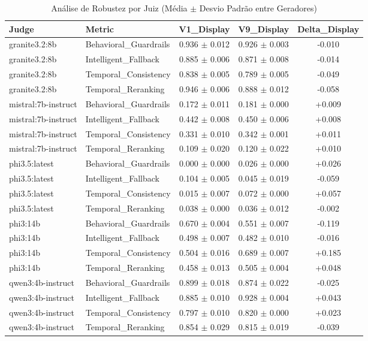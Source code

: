 \begin{table}
\caption{Análise de Robustez por Juiz (Média $\pm$ Desvio Padrão entre Geradores)}
\label{tab:robustez_por_juiz}
\begin{tabular}{llccc}
\toprule
Judge & Metric & V1_Display & V9_Display & Delta_Display \\
\midrule
granite3.2:8b & Behavioral_Guardrails & 0.936 $\pm$ 0.012 & 0.926 $\pm$ 0.003 & -0.010 \\
granite3.2:8b & Intelligent_Fallback & 0.885 $\pm$ 0.006 & 0.871 $\pm$ 0.008 & -0.014 \\
granite3.2:8b & Temporal_Consistency & 0.838 $\pm$ 0.005 & 0.789 $\pm$ 0.005 & -0.049 \\
granite3.2:8b & Temporal_Reranking & 0.946 $\pm$ 0.006 & 0.888 $\pm$ 0.012 & -0.058 \\
mistral:7b-instruct & Behavioral_Guardrails & 0.172 $\pm$ 0.011 & 0.181 $\pm$ 0.000 & +0.009 \\
mistral:7b-instruct & Intelligent_Fallback & 0.442 $\pm$ 0.008 & 0.450 $\pm$ 0.006 & +0.008 \\
mistral:7b-instruct & Temporal_Consistency & 0.331 $\pm$ 0.010 & 0.342 $\pm$ 0.001 & +0.011 \\
mistral:7b-instruct & Temporal_Reranking & 0.109 $\pm$ 0.020 & 0.120 $\pm$ 0.022 & +0.010 \\
phi3.5:latest & Behavioral_Guardrails & 0.000 $\pm$ 0.000 & 0.026 $\pm$ 0.000 & +0.026 \\
phi3.5:latest & Intelligent_Fallback & 0.104 $\pm$ 0.005 & 0.045 $\pm$ 0.019 & -0.059 \\
phi3.5:latest & Temporal_Consistency & 0.015 $\pm$ 0.007 & 0.072 $\pm$ 0.000 & +0.057 \\
phi3.5:latest & Temporal_Reranking & 0.038 $\pm$ 0.000 & 0.036 $\pm$ 0.012 & -0.002 \\
phi3:14b & Behavioral_Guardrails & 0.670 $\pm$ 0.004 & 0.551 $\pm$ 0.007 & -0.119 \\
phi3:14b & Intelligent_Fallback & 0.498 $\pm$ 0.007 & 0.482 $\pm$ 0.010 & -0.016 \\
phi3:14b & Temporal_Consistency & 0.504 $\pm$ 0.016 & 0.689 $\pm$ 0.007 & +0.185 \\
phi3:14b & Temporal_Reranking & 0.458 $\pm$ 0.013 & 0.505 $\pm$ 0.004 & +0.048 \\
qwen3:4b-instruct & Behavioral_Guardrails & 0.899 $\pm$ 0.018 & 0.874 $\pm$ 0.022 & -0.025 \\
qwen3:4b-instruct & Intelligent_Fallback & 0.885 $\pm$ 0.010 & 0.928 $\pm$ 0.004 & +0.043 \\
qwen3:4b-instruct & Temporal_Consistency & 0.797 $\pm$ 0.010 & 0.820 $\pm$ 0.000 & +0.023 \\
qwen3:4b-instruct & Temporal_Reranking & 0.854 $\pm$ 0.029 & 0.815 $\pm$ 0.019 & -0.039 \\
\bottomrule
\end{tabular}
\end{table}
